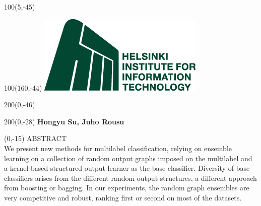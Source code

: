 \documentclass[a4poster]{article}
\begin{document}
\pagestyle{empty} %

\begin{textblock}{100}(5,-45)
\end{textblock}

\begin{textblock}{100}(160,-44)
		\includegraphics[scale=0.43]{./template_pics/hiit_logo.png}		%
\end{textblock}

\begin{textblock}{200}(0,-46)
	{\sffamily{}}
\end{textblock}

\begin{textblock}{200}(0,-28)
	{\center\small{\bfseries{Hongyu Su, Juho Rousu\\}}
	\footnotesize{}}
	\vspace{2mm}
\end{textblock}

\begin{textblock}{60}(0,-15)
	\sffamily
	\Large{\color{sciorange} ABSTRACT}\\
	\small
	We present new methods for multilabel classification, relying on ensemble learning on a collection of random output graphs imposed on the multilabel and a kernel-based structured output learner as the base classifier.
	Diversity of base classifiers arises from the different random output structures, a different approach from boosting or bagging. In our experiments, the random graph ensembles are very competitive and robust, ranking first or second on most of the datasets.
\end{textblock}
\end{document}
